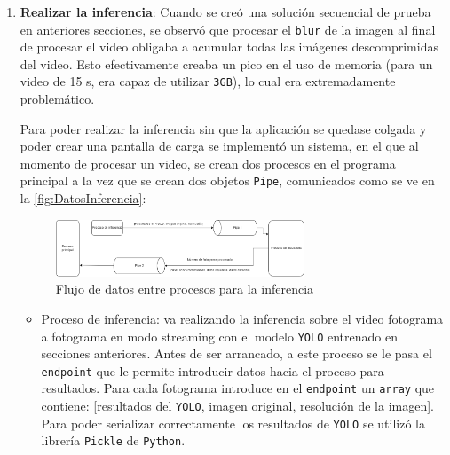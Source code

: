 \begin{enumerate}
    \item \textbf{Realizar la inferencia}:\newline
    Cuando se creó una solución secuencial de prueba en anteriores secciones, se observó que procesar el \texttt{blur} de la imagen al final de procesar el video obligaba a acumular todas las imágenes 
    descomprimidas del video. Esto efectivamente creaba un pico en el uso de memoria  (para un video de 15 s, era capaz de utilizar \texttt{3GB}), lo cual era extremadamente problemático.

    Para poder realizar la inferencia sin que la aplicación se quedase colgada y poder crear una pantalla de carga se implementó un sistema, en el que al momento de procesar un video, se crean dos procesos 
    en el programa principal a la vez que se crean dos objetos \texttt{Pipe}, comunicados como se ve en la \autoref{fig:DatosInferencia}:
    \begin{figure}[H]
        \centering
        \includegraphics[width=0.7\textwidth]{images/6/6.5/Procesos1.png}
        \caption{Flujo de datos entre procesos para la inferencia}
        \label{fig:DatosInferencia}
    \end{figure}
    \vspace{2\baselineskip}
    \begin{itemize}
        \item Proceso de inferencia: va realizando la inferencia sobre el video fotograma a fotograma en modo streaming con el modelo \texttt{YOLO} entrenado en secciones anteriores. Antes de ser arrancado, 
        a este proceso se le pasa el \texttt{endpoint} que le permite introducir datos hacia el proceso para resultados. Para cada fotograma introduce en el \texttt{endpoint} un \texttt{array} que contiene: 
        [resultados del \texttt{YOLO}, imagen original, resolución de la imagen]. Para poder serializar correctamente los resultados de \texttt{YOLO} se utilizó la librería \texttt{Pickle} de \texttt{Python}.
        

\end{itemize}
\end{enumerate}
